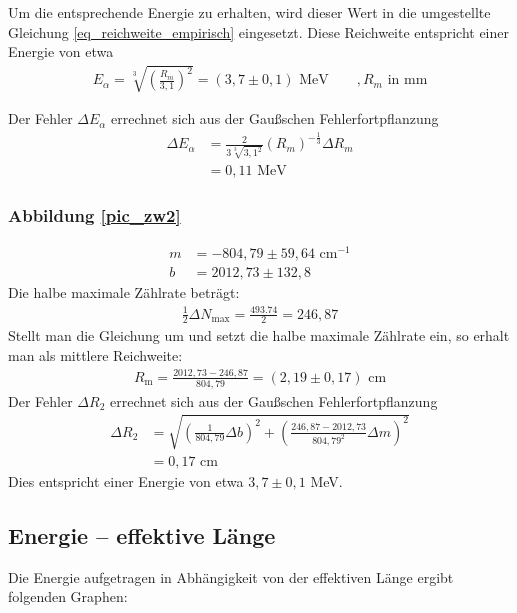 Um die entsprechende Energie zu erhalten, wird dieser Wert in die umgestellte Gleichung \eqref{eq_reichweite_empirisch} eingesetzt. 
Diese Reichweite entspricht einer Energie von etwa 
\begin{align*}
E_\alpha=\sqrt[3]{\left(\frac{R_m}{3,1}\right)^2} = (3,7 \pm 0,1)\text{ MeV} \qquad ,R_m \text{ in mm}
\end{align*}

Der Fehler $\Delta E_\alpha$ errechnet sich aus der Gaußschen Fehlerfortpflanzung
\begin{align*}
\Delta E_\alpha&={\frac{2}{3\sqrt[3]{3,1^2}}\left({R_m}\right)^{-\frac{1}{3}}}\Delta R_m\\
&= 0,11\text{ MeV}
\end{align*}

\subsubsection{Abbildung \ref{pic_zw2}}
\begin{align*}
m&=-804,79 \pm 59,64 \text{ cm}^{-1}\\
b&= 2012,73  \pm 132,8
\end{align*}
Die halbe maximale Zählrate beträgt:
\begin{align*}
 \frac{1}{2}\Delta N_\text{max} = \frac{493.74}{2} = 246,87
\end{align*}
Stellt man die Gleichung um und setzt die halbe maximale Zählrate ein, so erhalt man als mittlere Reichweite:
\begin{align*}
R_\text{m}=\frac{2012,73-246,87}{804,79} = (2,19\pm0,17) \text{ cm}
\end{align*}
Der Fehler $\Delta R_2$ errechnet sich aus der Gaußschen Fehlerfortpflanzung
\begin{align*}
\Delta R_2&=\sqrt{\left(\frac{1}{804,79}\Delta b\right)^2+\left(\frac{246,87-2012,73}{804,79^2}\Delta m\right)^2}\\ 
&= 0,17 \text{ cm}
\end{align*}
Dies entspricht einer Energie von etwa $3,7\pm0,1 $ MeV.
\subsection{Energie -- effektive Länge}
Die Energie aufgetragen in Abhängigkeit von der effektiven Länge ergibt folgenden Graphen:

